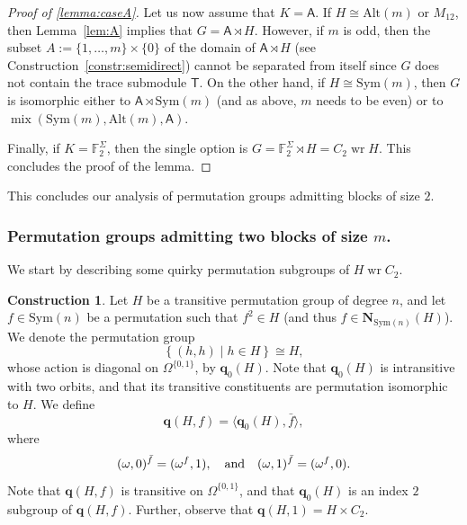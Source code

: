 \documentclass[a4paper]{amsart}
\newcommand{\Sym}{\mathrm{Sym}}
\newcommand{\Alt}{\mathrm{Alt}}
\renewcommand{\wr}{\mathop{\mathrm{wr}}}
\newcommand{\FF}{\mathbb{F}}
\newcommand{\mix}{\mathop{\mathrm{mix}}}
\newcommand{\qrk}{\mathbf{q}}
\newcommand{\A}{\mathsf{A}}
\theoremstyle{definition}
\newtheorem{construction}[theorem]{Construction}
\begin{document}
\begin{proof}[Proof of \cref{lemma:caseA}]
Let us now assume that $K=\A$. If $H\cong \Alt(m)$ or $M_{12}$, then Lemma~\ref{lem:A} implies that
$G=\A \rtimes H$. 
However, if $m$ is odd, then the subset
$A:= \{1,\ldots,m\} \times \{0\}$
of the domain of $\A \rtimes H$ (see Construction~\ref{constr:semidirect}) cannot be separated from itself since $G$ does not contain
the trace submodule $\mathsf{T}$.
On the other hand, if $H\cong \Sym(m)$, then $G$ is isomorphic either to $\A \rtimes \Sym(m)$ (and as above, $m$ needs to be even)
or to $\mix(\Sym(m),\Alt(m),\A)$.

Finally, if $K=\FF_2^\Sigma$, then the single option is $G=\FF_2^\Sigma \rtimes H = C_2 \wr H$.
This concludes the proof of the lemma.
\end{proof}

This concludes our analysis of permutation groups admitting blocks of size $2$.


\subsubsection{Permutation groups admitting two blocks of size $m$.}
We start by describing some quirky permutation subgroups of $H \wr C_2$.
\begin{construction}\label{con:nonEq}
    Let $H$ be a transitive permutation group of degree $n$, and let $f\in \Sym(n)$ be a permutation such that $f^2 \in H$ (and thus $f \in \mathbf{N}_{\Sym(n)}(H)$). We denote the permutation group
    \[\left\{ (h,h) \mid h\in H \right\} \cong H ,\]
    whose action is diagonal on $\Omega^{\{0,1\}}$,  by $\qrk_0(H)$.
    Note that $\qrk_0(H)$ is intransitive with two orbits, and that its transitive constituents are permutation isomorphic to $H$. %
    We define
    \[\qrk(H,f) = \langle \qrk_0(H), \bar f \rangle ,\]
    where
    \[ (\omega,0)^{\bar f} = (\omega^f, 1), \quad \hbox{and} \quad  (\omega,1)^{\bar f} = (\omega^{f},0) .\]
    Note that $\qrk(H,f)$ is transitive on $\Omega ^ {\{0,1\}}$, and that $\qrk_0(H)$ is an index $2$ subgroup of $\qrk(H,f)$. Further, observe that $\qrk(H,1) = H \times C_2$.
\end{construction}
\end{document}
